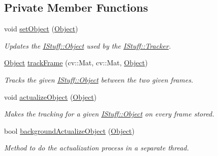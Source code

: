 \subsection*{Private Member Functions}
\begin{DoxyCompactItemize}
\item 
void \hyperlink{class_i_stuff_1_1_tracker_a0a65a60fae69f48ad3cc3b7581128c3d}{set\-Object} (\hyperlink{class_i_stuff_1_1_object}{Object})
\begin{DoxyCompactList}\small\item\em Updates the \hyperlink{class_i_stuff_1_1_object}{I\-Stuff\-::\-Object} used by the \hyperlink{class_i_stuff_1_1_tracker}{I\-Stuff\-::\-Tracker}. \end{DoxyCompactList}\item 
\hyperlink{class_i_stuff_1_1_object}{Object} \hyperlink{class_i_stuff_1_1_tracker_abbd2fe5afc84816d781f23ad98e8d488}{track\-Frame} (cv\-::\-Mat, cv\-::\-Mat, \hyperlink{class_i_stuff_1_1_object}{Object})
\begin{DoxyCompactList}\small\item\em Tracks the given \hyperlink{class_i_stuff_1_1_object}{I\-Stuff\-::\-Object} between the two given frames. \end{DoxyCompactList}\item 
void \hyperlink{class_i_stuff_1_1_tracker_aa262d69317aeaa699b42ab5a22960b07}{actualize\-Object} (\hyperlink{class_i_stuff_1_1_object}{Object})
\begin{DoxyCompactList}\small\item\em Makes the tracking for a given \hyperlink{class_i_stuff_1_1_object}{I\-Stuff\-::\-Object} on every frame stored. \end{DoxyCompactList}\item 
bool \hyperlink{class_i_stuff_1_1_tracker_a3c230057ef289346b9037d315bee4a86}{background\-Actualize\-Object} (\hyperlink{class_i_stuff_1_1_object}{Object})
\begin{DoxyCompactList}\small\item\em Method to do the actualization process in a separate thread. \end{DoxyCompactList}\end{DoxyCompactItemize}
